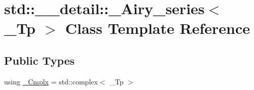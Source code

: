 \hypertarget{classstd_1_1____detail_1_1__Airy__series}{}\section{std\+:\+:\+\_\+\+\_\+detail\+:\+:\+\_\+\+Airy\+\_\+series$<$ \+\_\+\+Tp $>$ Class Template Reference}
\label{classstd_1_1____detail_1_1__Airy__series}
\subsection*{Public Types}
\begin{DoxyCompactItemize}
\item 
using \hyperlink{classstd_1_1____detail_1_1__Airy__series_ab41161caa54609f4735987fbaed41d9d}{\+\_\+\+Cmplx} = std\+::complex$<$ \+\_\+\+Tp $>$
\end{DoxyCompactItemize}
